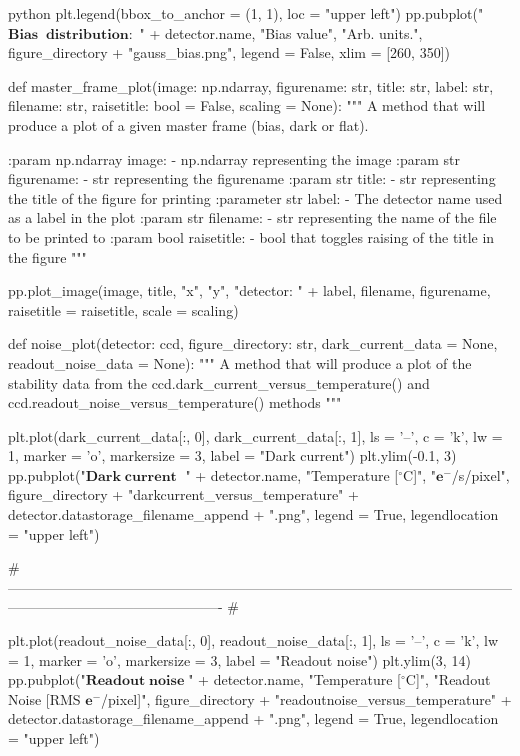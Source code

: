 \documentclass[../main.tex]{subfiles}
\begin{document}
\begin{mintedbox}{python}
plt.legend(bbox_to_anchor  =  (1, 1), loc  =  "upper left")
pp.pubplot("$\mathbf{Bias\;\;distribution:}$ " + detector.name, "Bias value", "Arb. units.",
figure_directory + "gauss_bias.png", legend  =  False, xlim  =  [260, 350])


def master_frame_plot(image: np.ndarray, figurename: str, title: str, label: str, filename: str,
raisetitle: bool  =  False, scaling  =  None):
"""
A method that will produce a plot of a given master frame (bias, dark or flat).

:param np.ndarray image:
- np.ndarray representing the image
:param str figurename:
- str representing the figurename
:param str title:
- str representing the title of the figure for printing
:parameter str label:
- The detector name used as a label in the plot
:param str filename:
- str representing the name of the file to be printed to
:param bool raisetitle:
- bool that toggles raising of the title in the figure
"""

pp.plot_image(image, title, "x", "y", "detector: " + label, filename, figurename, raisetitle  =  raisetitle,
scale  =  scaling)


def noise_plot(detector: ccd, figure_directory: str, dark_current_data  =  None, readout_noise_data  =  None):
"""
A method that will produce a plot of the stability data
from the ccd.dark_current_versus_temperature() and ccd.readout_noise_versus_temperature() methods
"""

plt.plot(dark_current_data[:, 0], dark_current_data[:, 1], ls  =  '--', c  =  'k', lw  =  1, marker  =  'o', markersize  =  3,
label  =  "Dark current")
plt.ylim(-0.1, 3)
pp.pubplot("$\mathbf{Dark\;current\;}$ " + detector.name, "Temperature [$^\circ$C]", "$\mathbf{e}^-$/s/pixel",
figure_directory + "darkcurrent_versus_temperature" + detector.datastorage_filename_append + ".png",
legend  =  True, legendlocation  =  "upper left")

# ---------------------------------------------------------------------------------------------------------------------------------------------------------- #

plt.plot(readout_noise_data[:, 0], readout_noise_data[:, 1], ls  =  '--', c  =  'k', lw  =  1, marker  =  'o',
markersize  =  3, label  =  "Readout noise")
plt.ylim(3, 14)
pp.pubplot("$\mathbf{Readout\;noise\;}$" + detector.name, "Temperature [$^\circ$C]",
"Readout Noise [RMS $\mathbf{e}^-$/pixel]",
figure_directory + "readoutnoise_versus_temperature" + detector.datastorage_filename_append + ".png",
legend  =  True, legendlocation  =  "upper left")



\end{mintedbox}
\end{document}
